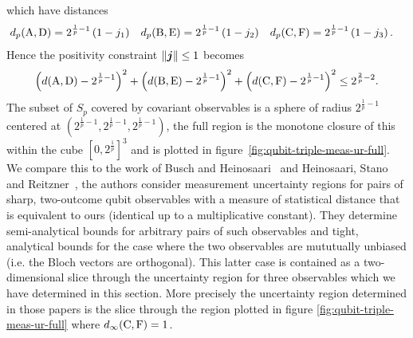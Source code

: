 which have distances
\begin{align}
  d_p(\operatorname{A}, \operatorname{D}) &= 2^{\frac{1}{p} -1}\left(1-j_1\right)&
                                                           d_p(\operatorname{B}, \operatorname{E}) &= 2^{\frac{1}{p} -1}\left(1-j_2\right)&
                                                                                                                    d_p(\operatorname{C}, \operatorname{F}) &= 2^{\frac{1}{p} -1}\left(1-j_3\right).
\end{align}
Hence the positivity constraint ${\left\lVert{\bm{j}}\right\rVert}\leq 1$ becomes
\begin{equation}
  \left(d(\operatorname{A}, \operatorname{D}) - 2^{\frac{1}{p}-1}\right)^2 + \left(d(\operatorname{B}, \operatorname{E}) - 2^{\frac{1}{p}-1}\right)^2 +\left(d(\operatorname{C}, \operatorname{F}) - 2^{\frac{1}{p}-1}\right)^2 \leq 2^{\frac{2}{p}-2}.
\end{equation}
The subset of $S_p$ covered by covariant observables is a sphere of radius $2^{\frac{1}{p}-1}$ centered at $\left(2^{\frac{1}{p}-1},2^{\frac{1}{p}-1},2^{\frac{1}{p}-1}\right)$, the full region is the monotone closure of this within the cube $[0, 2^{\frac{1}{p}}]^3$ and is plotted in figure~\ref{fig:qubit-triple-meas-ur-full}. We compare this to the work of Busch and Heinosaari~\cite{BuschHeinosaari2008} and Heinosaari, Stano and Reitzner~\cite{HEINOSAARI-STANO-REITZNER-2008}, the authors consider measurement uncertainty regions for pairs of sharp, two-outcome qubit observables with a measure of statistical distance that is equivalent to ours (identical up to a multiplicative constant). They determine semi-analytical bounds for arbitrary pairs of such observables and tight, analytical bounds for the case where the two observables are mututually unbiased (i.e. the Bloch vectors are orthogonal). This latter case is contained as a two-dimensional slice through the uncertainty region for three observables which we have determined in this section. More precisely the uncertainty region determined in those papers is the slice through the region plotted in figure \ref{fig:qubit-triple-meas-ur-full} where $d_\infty(\operatorname{C}, \operatorname{F}) = 1$.

